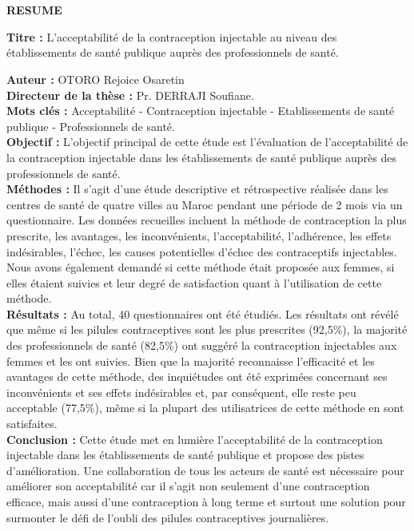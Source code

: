 \section*{}

\pagebreak


\begin{center}
  \textbf{RESUME}
  
\end{center}

\noindent \textbf{Titre :} L’acceptabilité de la contraception injectable au niveau des établissements de santé publique auprès des professionnels de santé.  

\noindent \textbf{Auteur :} OTORO Rejoice Osaretin \\
\textbf{Directeur de la thèse :} Pr. DERRAJI Soufiane.  \\
\textbf{Mots clés :} Acceptabilité - Contraception injectable - Etablissements de santé publique - Professionnels de santé. \\

\noindent \textbf{Objectif :} L’objectif principal de cette étude est l’évaluation de l’acceptabilité de la contraception injectable dans les établissements de santé publique auprès des professionnels de santé. \\

\noindent \textbf{Méthodes :} Il s’agit d’une étude descriptive et rétrospective réalisée dans les centres de santé de quatre villes au Maroc pendant une période de 2 mois via un questionnaire. Les données recueilles incluent la méthode de contraception la plus prescrite, les avantages, les inconvénients, l’acceptabilité, l’adhérence, les effets indésirables, l’échec, les causes potentielles d’échec des contraceptifs injectables. Nous avons également demandé si cette méthode était proposée aux femmes, si elles étaient suivies et leur degré de satisfaction quant à l’utilisation de cette méthode. \\
   
\noindent \textbf{Résultats :} Au total, 40 questionnaires ont été étudiés. Les résultats ont révélé que même si les pilules contraceptives sont les plus prescrites (92,5\%), la majorité des professionnels de santé (82,5\%) ont suggéré la contraception injectables aux femmes et les ont suivies. Bien que la majorité reconnaisse l’efficacité et les avantages de cette méthode, des inquiétudes ont été exprimées concernant ses inconvénients et ses effets indésirables et, par conséquent, elle reste peu acceptable (77,5\%), même si la plupart des utilisatrices de cette méthode en sont satisfaites. \\
   
\noindent \textbf{Conclusion :} Cette étude met en lumière l’acceptabilité de la contraception injectable dans les établissements de santé publique et propose des pistes d’amélioration. Une collaboration de tous les acteurs de santé est nécessaire pour améliorer son acceptabilité car il s’agit non seulement d’une contraception efficace, mais aussi d’une contraception à long terme et surtout une solution pour surmonter le défi de l’oubli des pilules contraceptives journalières.  


